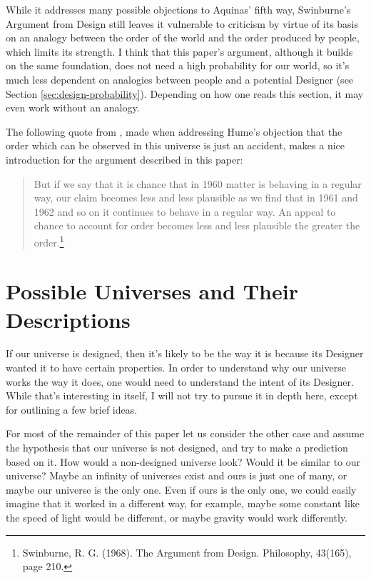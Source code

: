 \documentclass[a4paper
,draft
]{article}
\newcommand{\paper}[1]{paper}
\begin{document}
While it addresses many possible objections to Aquinas' fifth way,
Swinburne’s Argument from Design still leaves it vulnerable to criticism
by virtue of its basis on an analogy between the order of the world and the order
produced by people, which limits its strength.
I think that this \paper{}'s argument, although it builds on the same
foundation, does not need a high probability for our world,
so it’s much less dependent on analogies between people
and a potential Designer
(see Section \ref{sec:design-probability}).
Depending on how one reads this section, it may even work without an analogy.

The following quote from \textcite{swinburne1968}, made when addressing
Hume's objection that the order which can be observed in this universe
is just an accident, makes a nice introduction for the argument
described in this \paper{}:
\begin{quote}
But if we say that it is chance that in 1960 matter is behaving in a
regular way, our claim becomes less and less plausible as we find that in
1961 and 1962 and so on it continues to behave in a regular way. An appeal
to chance to account for order becomes less and less plausible
the greater the order.\footnote{
  Swinburne, R. G. (1968). The Argument from Design. Philosophy, 43(165), page 210.}
\end{quote}


\section{Possible Universes and Their Descriptions}
\label{sec:possible-universes}

If our universe is designed, then it's likely to be the way it is because
its Designer wanted it to have certain properties.
In order to understand why our universe works the way it does,
one would need to understand the intent of its Designer.
While that's interesting in itself, I will not try to pursue it in depth here,
except for outlining a few brief ideas.

For most of the remainder of this \paper{} let us consider the other case
and assume the hypothesis that our universe is not designed,
and try to make a prediction based on it.
How would a non-designed universe look?
Would it be similar to our universe?
Maybe an infinity of universes exist and ours is just one of many,
or maybe our universe is the only one.
Even if ours is the only one, we could easily imagine that it worked
in a different way, for example, maybe some constant like the speed of light would be
different, or maybe gravity would work differently.
\end{document}
